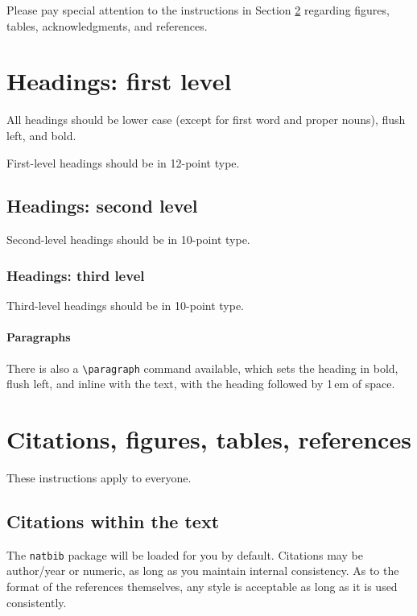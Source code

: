 \documentclass{article}
\begin{document}
Please pay special attention to the instructions in Section \ref{others}
regarding figures, tables, acknowledgments, and references.

\section{Headings: first level}
\label{headings}


All headings should be lower case (except for first word and proper nouns),
flush left, and bold.


First-level headings should be in 12-point type.


\subsection{Headings: second level}


Second-level headings should be in 10-point type.


\subsubsection{Headings: third level}


Third-level headings should be in 10-point type.


\paragraph{Paragraphs}


There is also a \verb+\paragraph+ command available, which sets the heading in
bold, flush left, and inline with the text, with the heading followed by 1\,em
of space.


\section{Citations, figures, tables, references}
\label{others}


These instructions apply to everyone.


\subsection{Citations within the text}


The \verb+natbib+ package will be loaded for you by default.  Citations may be
author/year or numeric, as long as you maintain internal consistency.  As to the
format of the references themselves, any style is acceptable as long as it is
used consistently.
\end{document}

